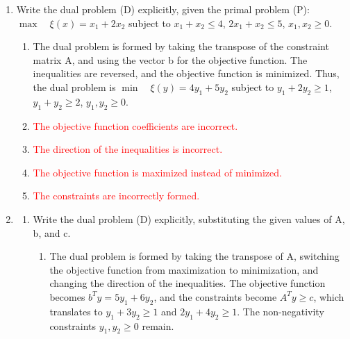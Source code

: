 \documentclass{article}%
\newcommand{\incorrect}[1]{\textcolor{red}{#1}}
\begin{document}
\begin{enumerate}
\begin{enumerate}%
\item \incorrect{This uses the values from $c$ instead of $b$.}%
\item The dual objective function is given by $\xi(y) = b^T y$.  Substituting the given value of $b$, we get $\xi(y) = \begin{pmatrix} 5 & 6 \end{pmatrix} \begin{pmatrix} y_1 \\ y_2 \end{pmatrix} = 5y_1 + 6y_2$.%
\item \incorrect{This uses some elements from $A$ and $b$ incorrectly.}%
\item \incorrect{This swaps the elements of $b$.}%
\item \incorrect{This uses elements from $A$ instead of $b$.}%
\end{enumerate}%
\vspace{1em}%
\item Write the dual problem (D) explicitly, given the primal problem (P): $\max \quad \xi(x) = x_1 + 2x_2$ subject to $x_1 + x_2 \le 4$, $2x_1 + x_2 \le 5$, $x_1, x_2 \ge 0$.%
\begin{enumerate}%
\item The dual problem is formed by taking the transpose of the constraint matrix A, and using the vector b for the objective function. The inequalities are reversed, and the objective function is minimized. Thus, the dual problem is $\min \quad \xi(y) = 4y_1 + 5y_2$ subject to $y_1 + 2y_2 \ge 1$, $y_1 + y_2 \ge 2$, $y_1, y_2 \ge 0$.%
\item \incorrect{The objective function coefficients are incorrect.}%
\item \incorrect{The direction of the inequalities is incorrect.}%
\item \incorrect{The objective function is maximized instead of minimized.}%
\item \incorrect{The constraints are incorrectly formed.}%
\end{enumerate}%
\vspace{1em}%
\item%
\begin{enumerate}%
\item Write the dual problem (D) explicitly, substituting the given values of A, b, and c.%
\begin{enumerate}%
\item The dual problem is formed by taking the transpose of A, switching the objective function from maximization to minimization, and changing the direction of the inequalities. The objective function becomes $b^T y = 5y_1 + 6y_2$, and the constraints become $A^T y \ge c$, which translates to $y_1 + 3y_2 \ge 1$ and $2y_1 + 4y_2 \ge 1$. The non-negativity constraints $y_1, y_2 \ge 0$ remain.%

\end{enumerate}
\end{enumerate}
\end{enumerate}
\end{document}
